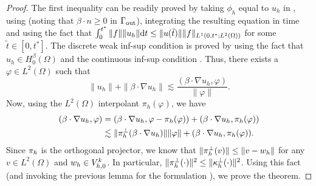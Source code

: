 \begin{proof}
The first inequality can be readily proved by taking $\phi_h$ equal to $u_h$ in , using  (noting that $\beta\cdot n\geq0$ in $\Gamma_{\rm out}$), integrating the resulting equation in time and using the fact that $\int_0^{t^*} \|f\| \|u_h\|  {\rm d}t\leq  \|u(\tilde{t})\| \|f\|_{L^1(0,t^*;L^2(\Omega))}$ for some $\tilde{t}\in [0,t^*]$. The discrete weak inf-sup condition  is proved by using the fact that $u_h \in H^\beta_0(\Omega)$ and the continuous inf-sup condition . Thus, there exists a $\varphi \in L^2(\Omega)$ such that
$$\| u_h \| + \| \beta \cdot \nabla u_h \| \lesssim \frac{(\beta \cdot \nabla u_h , \varphi)}{\|\varphi\|}.$$
Now, using the $L^2(\Omega)$ interpolant $\pi_h(\varphi)$, we have
\begin{align*}
(\beta \cdot \nabla u_h , \varphi) & =   (\beta \cdot \nabla u_h , \varphi - \pi_h(\varphi)) +  (\beta \cdot \nabla u_h , \pi_h(\varphi)) \nonumber \\
& \lesssim \| \pi_h^\perp(\beta \cdot \nabla u_h) \| \|\varphi\| + (\beta \cdot \nabla u_h , \pi_h(\varphi)). 
\end{align*}
Since $\pi_{h}$ is the orthogonal projector, we know that $\|\pi_{h}^\perp(v)\|\leq \|v-w_h\|$ for any $v\in L^2(\Omega)$ and $w_h\in V^k_{h,0}$. In particular, $\|\pi_{h}^\perp(\cdot)\|^2 \leq \|\kappa_h^\perp(\cdot)\|^2$. Using this fact (and invoking the previous lemma for the formulation ), we prove the theorem.
\end{proof}

